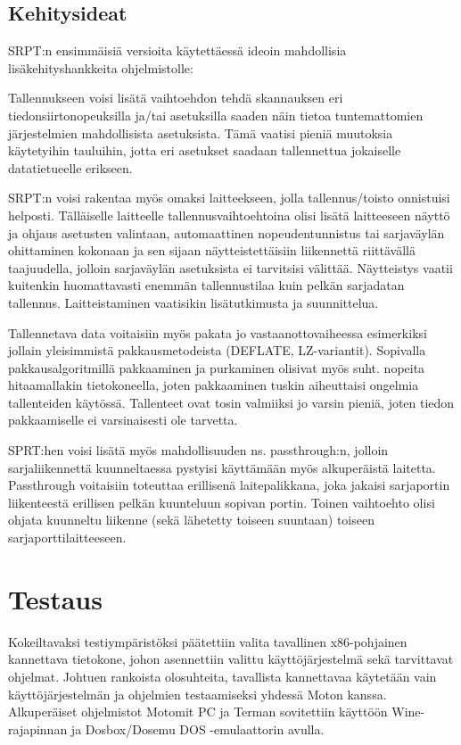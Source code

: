 \subsection{Kehitysideat}

SRPT:n ensimmäisiä versioita käytettäessä ideoin mahdollisia lisäkehityshankkeita ohjelmistolle:

Tallennukseen voisi lisätä vaihtoehdon tehdä skannauksen eri tiedonsiirtonopeuksilla ja/tai asetuksilla saaden näin tietoa tuntemattomien järjestelmien mahdollisista asetuksista. Tämä vaatisi pieniä muutoksia käytetyihin tauluihin, jotta eri asetukset saadaan tallennettua jokaiselle datatietueelle erikseen.

SRPT:n voisi rakentaa myös omaksi laitteekseen, jolla tallennus/toisto onnistuisi helposti. Tälläiselle laitteelle tallennusvaihtoehtoina olisi lisätä laitteeseen näyttö ja ohjaus asetusten valintaan, automaattinen nopeudentunnistus tai sarjaväylän ohittaminen kokonaan ja sen sijaan näytteistettäisiin liikennettä riittävällä taajuudella, jolloin sarjaväylän asetuksista ei tarvitsisi välittää. Näytteistys vaatii kuitenkin huomattavasti enemmän tallennustilaa kuin pelkän sarjadatan tallennus. Laitteistaminen vaatisikin lisätutkimusta ja suunnittelua.

Tallennetava data voitaisiin myös pakata jo vastaanottovaiheessa esimerkiksi jollain yleisimmistä pakkausmetodeista (DEFLATE, LZ-variantit). Sopivalla pakkausalgoritmillä pakkaaminen ja purkaminen olisivat myös suht. nopeita hitaamallakin tietokoneella, joten pakkaaminen tuskin aiheuttaisi ongelmia tallenteiden käytössä. Tallenteet ovat tosin valmiiksi jo varsin pieniä, joten tiedon pakkaamiselle ei varsinaisesti ole tarvetta.

SPRT:hen voisi lisätä myös mahdollisuuden ns. passthrough:n, jolloin sarjaliikennettä kuunneltaessa pystyisi käyttämään myös alkuperäistä laitetta. Passthrough voitaisiin toteuttaa erillisenä laitepalikkana, joka jakaisi sarjaportin liikenteestä erillisen pelkän kuunteluun sopivan portin. Toinen vaihtoehto olisi ohjata kuunneltu liikenne (sekä lähetetty toiseen suuntaan) toiseen sarjaporttilaitteeseen.

\section{Testaus}
Kokeiltavaksi testiympäristöksi päätettiin valita tavallinen x86-pohjainen kannettava tietokone, johon asennettiin valittu käyttöjärjestelmä sekä tarvittavat ohjelmat. Johtuen rankoista olosuhteita, tavallista kannettavaa käytetään vain käyttöjärjestelmän ja ohjelmien testaamiseksi yhdessä Moton kanssa. Alkuperäiset ohjelmistot Motomit PC ja Terman sovitettiin käyttöön Wine-rajapinnan ja Dosbox/Dosemu DOS -emulaattorin avulla.

